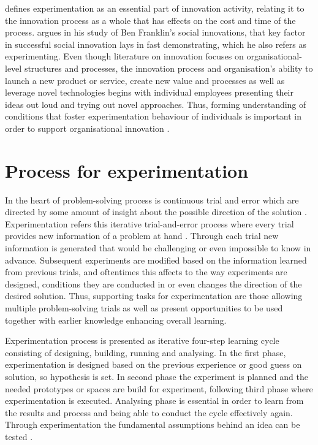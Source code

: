 \citet{thomke1998managing} defines experimentation as an essential part of innovation activity, relating it to the innovation process as a whole that has effects on the cost and time of the process. \citet{mumford2002social} argues in his study of Ben Franklin's social innovations, that key factor in successful social innovation lays in fast demonstrating, which he also refers as experimenting. Even though literature on innovation focuses on organisational-level structures and processes, the innovation process and organisation's ability to launch a new product or service, create new value and processes as well as leverage novel technologies begins with individual employees presenting their ideas out loud and trying out novel approaches. \citep{argote2000knowledge} Thus, forming understanding of conditions that foster experimentation behaviour of individuals is important in order to support organisational innovation \citep{thomke2003r}. 

\section{Process for experimentation}
In the heart of problem-solving process is continuous trial and error which are directed by some amount of insight about the possible direction of the solution \citep{barron200thinking}. Experimentation refers this iterative trial-and-error process where every trial provides new information of a problem at hand \citep{thomke1998modes}. Through each trial new information is generated that would be challenging or even impossible to know in advance. Subsequent experiments are modified based on the information learned from previous trials, and oftentimes this affects to the way experiments are designed, conditions they are conducted in or even changes the direction of the desired solution. \citep{thomke1998modes} Thus, supporting tasks for experimentation are those allowing multiple problem-solving trials as well as present opportunities to be used together with earlier knowledge enhancing overall learning. \citep{lee2004mixed}

Experimentation process is presented as iterative four-step learning cycle consisting of designing, building, running and analysing. In the first phase, experimentation is designed based on the previous experience or good guess on solution, so hypothesis is set. In second phase the experiment is planned and the needed prototypes or spaces are build for experiment, following third phase where experimentation is executed. Analysing phase is essential in order to learn from the results and process and being able to conduct the cycle effectively again. \citep{thomke1998managing} Through experimentation the fundamental assumptions behind an idea can be tested \citep{tuulenmaki2011art}.

